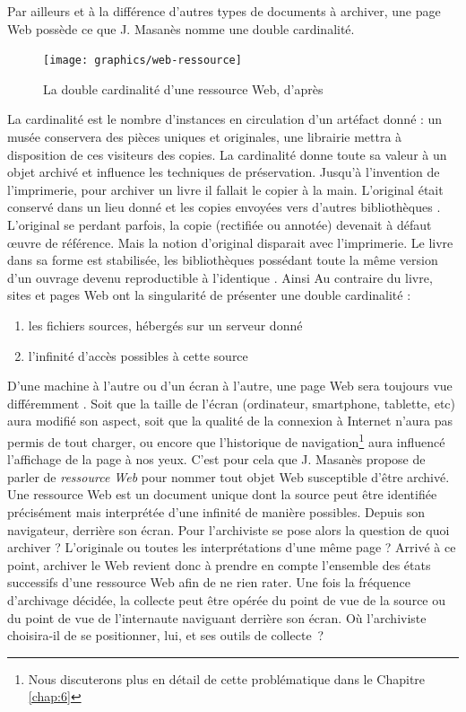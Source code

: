 \documentclass[symmetric,justified,marginals=raggedouter]{tufte-book}
\begin{document}
\noindent Par ailleurs et à la différence d'autres types de documents à archiver, une page Web possède ce que J. Masanès \citep{masanes_web_2006} nomme une double cardinalité. 

\begin{figure}
  \texttt{[image: graphics/web-ressource]}
  \caption{La double cardinalité d'une ressource Web, d'après \citep{masanes_web_2006}}
  \label{fig:web-ressource}
\end{figure} 

\noindent La cardinalité est le nombre d'instances en circulation d'un artéfact donné : un musée conservera des pièces uniques et originales, une librairie mettra à disposition de ces visiteurs des copies. La cardinalité donne toute sa valeur à un objet archivé et influence les techniques de préservation. Jusqu'à l'invention de l'imprimerie, pour archiver un livre il fallait le copier à la main. L'original était conservé dans un lieu donné et les copies envoyées vers d'autres bibliothèques \citep{canfora_vanished_1990}. L'original se perdant parfois, la copie (rectifiée ou annotée) devenait à défaut œuvre de référence. Mais la notion d'original disparait avec l'imprimerie. Le livre dans sa forme est stabilisée, les bibliothèques possédant toute la même version d'un ouvrage devenu reproductible à l'identique \citep{febvre_apparition_2013}. Ainsi  Au contraire du livre, sites et pages Web ont la singularité de présenter une double cardinalité : 

\begin{enumerate}[leftmargin=*]  
\item les fichiers sources, hébergés sur un serveur donné 
\item l'infinité d'accès possibles à cette source
\end{enumerate}

\noindent D'une machine à l'autre ou d'un écran à l'autre, une page Web sera toujours vue différemment \citep{bon_apres_2014}. Soit que la taille de l'écran (ordinateur, smartphone, tablette, etc) aura modifié son aspect, soit que la qualité de la connexion à Internet n'aura pas permis de tout charger, ou encore que l'historique de navigation\footnote{Nous discuterons plus en détail de cette problématique dans le Chapitre \ref{chap:6}} aura influencé l'affichage de la page à nos yeux. C'est pour cela que J. Masanès propose de parler de \textit{ressource Web} pour nommer tout objet Web susceptible d'être archivé. Une ressource Web est un document unique dont la source peut être identifiée précisément mais interprétée d'une infinité de manière possibles. Depuis son navigateur, derrière son écran. Pour l'archiviste se pose alors la question de quoi archiver ? L'originale ou toutes les interprétations d'une même page ? Arrivé à ce point, archiver le Web revient donc à prendre en compte l'ensemble des états successifs d'une ressource Web afin de ne rien rater. Une fois la fréquence d'archivage décidée, la collecte peut être opérée du point de vue de la source ou du point de vue de l'internaute naviguant derrière son écran. Où l'archiviste choisira-il de se positionner, lui, et ses outils de collecte~?
\end{document}

